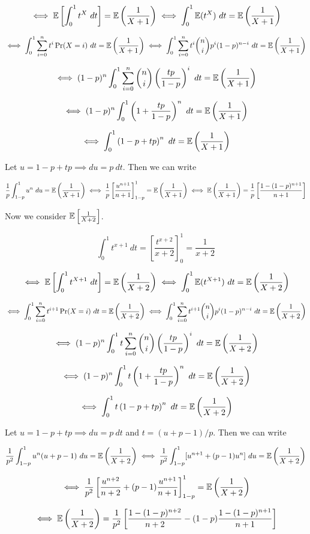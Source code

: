 \begin{solution}
\begin{enumerate}[(a)]
\[
 \iff \mathbb{E} \left[ \int_0^1 t^X  \ dt \right] = \mathbb{E} \left( \frac{1}{X+1} \right)  \iff \int_0^1 \mathbb{E} ( t^X)  \ dt = \mathbb{E} \left( \frac{1}{X+1} \right)
\]

\[
\iff \int_0^1 \sum_{i=0}^n t^i \Pr(X = i) \ dt = \mathbb{E} \left( \frac{1}{X+1} \right) \iff \int_0^1 \sum_{i=0}^n t^i \binom{n}{i} p^i (1-p)^{n-i} \ dt = \mathbb{E} \left( \frac{1}{X+1} \right)
\]

\[
 \iff (1-p)^n \int_0^1 \sum_{i=0}^n \binom{n}{i} \left( \frac{tp}{1-p} \right) ^i  \ dt = \mathbb{E} \left( \frac{1}{X+1} \right)
\]

\[
 \iff (1-p)^n \int_0^1 \left( 1 + \frac{tp}{1-p} \right)^n  \ dt = \mathbb{E} \left( \frac{1}{X+1} \right)
\]

\[
 \iff  \int_0^1 \left( 1 - p + tp  \right)^n  \ dt = \mathbb{E} \left( \frac{1}{X+1} \right)
\]

Let \(u = 1 - p + tp \implies du = p \ dt\). Then we can write

\[
\frac{1}{p} \int_{1-p}^1 u^n  \ du = \mathbb{E} \left( \frac{1}{X+1} \right) \iff \frac{1}{p} \left[ \frac{u^{n+1}}{n+1} \right]_{1-p}^1= \mathbb{E} \left( \frac{1}{X+1} \right)  \iff \mathbb{E} \left( \frac{1}{X+1} \right) = \frac{1}{p} \left[ \frac{1 - (1-p)^{n+1}}{n+1} \right]
\]

Now we consider \(\mathbb{E} \left[ \frac{1}{X+2} \right] \). 

\[
\int_0^1 t^{x+1}  \ dt = \left[ \frac{t^{x+2}}{x+2} \right]_0^1 =  \frac{1}{x+2}
\]

\[
 \iff \mathbb{E} \left[ \int_0^1 t^{X+1}  \ dt \right] = \mathbb{E} \left( \frac{1}{X+2} \right)  \iff \int_0^1 \mathbb{E} ( t^{X+1})  \ dt = \mathbb{E} \left( \frac{1}{X+2} \right)
\]

\[
\iff \int_0^1 \sum_{i=0}^n t^{i+1} \Pr(X = i) \ dt = \mathbb{E} \left( \frac{1}{X+2} \right) \iff \int_0^1 \sum_{i=0}^n t^{i+1} \binom{n}{i} p^i (1-p)^{n-i} \ dt = \mathbb{E} \left( \frac{1}{X+2} \right)
\]

\[
 \iff (1-p)^n \int_0^1 t\sum_{i=0}^n \binom{n}{i} \left( \frac{tp}{1-p} \right) ^i  \ dt = \mathbb{E} \left( \frac{1}{X+2} \right)
\]

\[
 \iff (1-p)^n \int_0^1t \left( 1 + \frac{tp}{1-p} \right)^n  \ dt = \mathbb{E} \left( \frac{1}{X+2} \right)
\]

\[
 \iff  \int_0^1 t\left( 1 - p + tp  \right)^n  \ dt = \mathbb{E} \left( \frac{1}{X+2} \right)
\]

Let \(u = 1 - p + tp \implies du = p \ dt\) and \(t = (u + p - 1)/p\). Then we can write

\[
\frac{1}{p^2} \int_{1-p}^1 u^n (u + p - 1) \ du = \mathbb{E} \left( \frac{1}{X+2} \right) \iff  \frac{1}{p^2} \int_{1-p}^1 [u^{n+1} + (p - 1)u^n] \ du = \mathbb{E} \left( \frac{1}{X+2} \right) 
\]

\[
\iff  \frac{1}{p^2} \left[\frac{u^{n+2}}{n+2} + (p - 1)\frac{u^{n+1}}{n+1} \right]_{1-p}^1 = \mathbb{E} \left( \frac{1}{X+2} \right) 
\]

\[
\iff   \mathbb{E} \left( \frac{1}{X+2} \right)  = \frac{1}{p^2} \left[\frac{1 - (1-p)^{n+2}}{n+2} - (1 - p)\frac{1 - (1-p)^{n+1}}{n+1} \right]
\]

\end{enumerate}

\end{solution}
%
%
%
%
%
%
%

